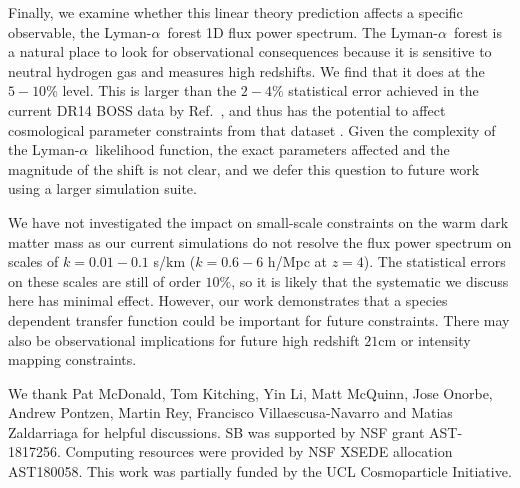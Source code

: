 \documentclass[a4paper,11pt]{article}
\newcommand{\Lya}{Lyman-$\alpha$}
\begin{document}
Finally, we examine whether this linear theory prediction affects a specific observable, the \Lya~forest 1D flux power spectrum. The \Lya~forest is a natural place to look for observational consequences because it is sensitive to neutral hydrogen gas and measures high redshifts.
We find that it does at the $5-10\%$ level. This is larger than the $2-4\%$ statistical error achieved in the current DR14 BOSS data by Ref.~\cite{Chabanier:2019}, and thus has the potential to affect cosmological parameter constraints from that dataset \cite[e.g][]{PD2019}. Given the complexity of the \Lya~likelihood function, the exact parameters affected and the magnitude of the shift is not clear, and we defer this question to future work using a larger simulation suite.

We have not investigated the impact on small-scale constraints on the warm dark matter mass \cite{Irsic:2017} as our current simulations do not resolve the flux power spectrum on scales of $k = 0.01 - 0.1$ s/km ($k = 0.6 - 6$ h/Mpc at $z = 4$). The statistical errors on these scales are still of order $10\%$, so it is likely that the systematic we discuss here has minimal effect. However, our work demonstrates that a species dependent transfer function could be important for future constraints. There may also be observational implications for future high redshift $21$cm or intensity mapping constraints.


\acknowledgments

We thank Pat McDonald, Tom Kitching, Yin Li, Matt McQuinn, Jose Onorbe, Andrew Pontzen, Martin Rey, Francisco Villaescusa-Navarro and Matias Zaldarriaga for helpful discussions. SB was supported by NSF grant AST-1817256. Computing resources were provided by NSF XSEDE allocation AST180058. This work was partially funded by the UCL Cosmoparticle Initiative.
\end{document}
